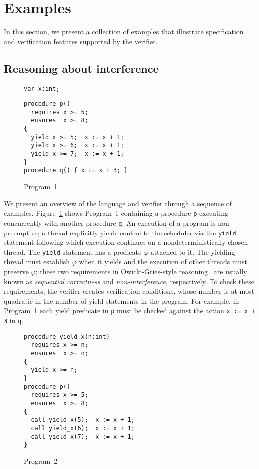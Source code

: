 \section{Examples}
\label{sec:examples}

In this section, we present a collection of examples that illustrate
specification and verification features supported by the \civl verifier.
\subsection{Reasoning about interference}
\begin{figure}
\begin{verbatim}
var x:int;
\end{verbatim}
\begin{verbatim}
procedure p()
  requires x >= 5;
  ensures  x >= 8;
{
  yield x >= 5;  x := x + 1;
  yield x >= 6;  x := x + 1;
  yield x >= 7;  x := x + 1;
}
procedure q() { x := x + 3; }
\end{verbatim}
\caption{Program~1}
\label{fig:ex1}
\end{figure}

We present an overview of the \civl language and verifier through a sequence of examples.
Figure~\ref{fig:ex1} shows Program~1 containing a procedure {\tt p}
executing concurrently with another procedure {\tt q}. 
An execution of a \civl program is non-preemptive; a thread explicitly yields control to the
scheduler via the {\tt yield} statement following which execution continues on a 
nondeterministically chosen thread.
The {\tt yield} statement has a predicate $\varphi$ attached to it.
The yielding thread must establish $\varphi$ when it yields and the execution of other threads 
must preserve $\varphi$; these two requirements in Owicki-Gries-style
reasoning~\cite{OwickiG76} are usually known as {\em sequential correctness}
and {\em non-interference}, respectively.
To check these requirements, the \civl verifier creates verification conditions, whose number is at most
quadratic in the number of yield statements in the program.
For example, in Program~1 each yield predicate in {\tt p} must be checked against the action 
{\tt x := x + 3} in {\tt q}.

\begin{figure}
\begin{verbatim}
procedure yield_x(n:int)
  requires x >= n;
  ensures  x >= n;
{
  yield x >= n;
}
procedure p()
  requires x >= 5;
  ensures  x >= 8;
{
  call yield_x(5);  x := x + 1;
  call yield_x(6);  x := x + 1;
  call yield_x(7);  x := x + 1;
}
\end{verbatim}
\caption{Program~2}
\label{fig:ex2}
\end{figure}

